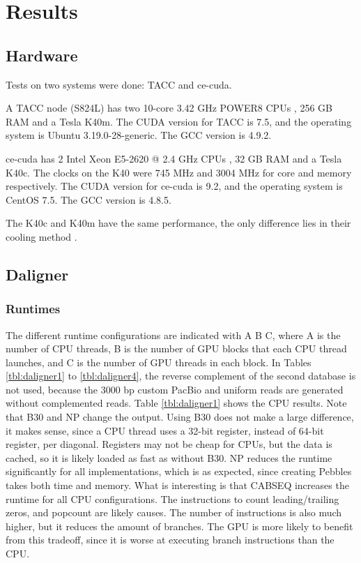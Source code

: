 \documentclass[../thesis.tex]{subfiles}
\begin{document}
\chapter{Results}
\ifdefined\main
\newcommand{\codePath}{5_results/code/}
\newcommand{\figPath}{5_results/figures/}
\else

\fi

\section{Hardware}
Tests on two systems were done: TACC \cite{TACC} and ce-cuda.

A TACC node (S824L) has two 10-core 3.42 GHz POWER8 CPUs \cite{datasheet_TACC}, 256 GB RAM and a Tesla K40m.
The CUDA version for TACC is 7.5, and the operating system is Ubuntu 3.19.0-28-generic.
The GCC version is 4.9.2.

ce-cuda has 2 Intel Xeon E5-2620 @ 2.4 GHz CPUs \cite{datasheet_ce_cuda}, 32 GB RAM and a Tesla K40c.
The clocks on the K40 were 745 MHz and 3004 MHz for core and memory respectively.
The CUDA version for ce-cuda is 9.2, and the operating system is CentOS 7.5.
The GCC version is 4.8.5.

The K40c and K40m have the same performance, the only difference lies in their cooling method \cite{K40m}.

\section{Daligner}
\subsection{Runtimes}
The different runtime configurations are indicated with A B C, where A is the number of CPU threads, B is the number of GPU blocks that each CPU thread launches, and C is the number of GPU threads in each block.
In Tables \ref{tbl:daligner1} to \ref{tbl:daligner4}, the reverse complement of the second database is not used, because the 3000 bp custom PacBio and uniform reads are generated without complemented reads.
Table \ref{tbl:daligner1} shows the CPU results.
Note that B30 and NP change the output.
Using B30 does not make a large difference, it makes sense, since a CPU thread uses a 32-bit register, instead of 64-bit register, per diagonal.
Registers may not be cheap for CPUs, but the data is cached, so it is likely loaded as fast as without B30.
NP reduces the runtime significantly for all implementations, which is as expected, since creating Pebbles takes both time and memory.
What is interesting is that CABSEQ increases the runtime for all CPU configurations.
The instructions to count leading/trailing zeros, and popcount are likely causes.
The number of instructions is also much higher, but it reduces the amount of branches.
The GPU is more likely to benefit from this tradeoff, since it is worse at executing branch instructions than the CPU.
\end{document}
